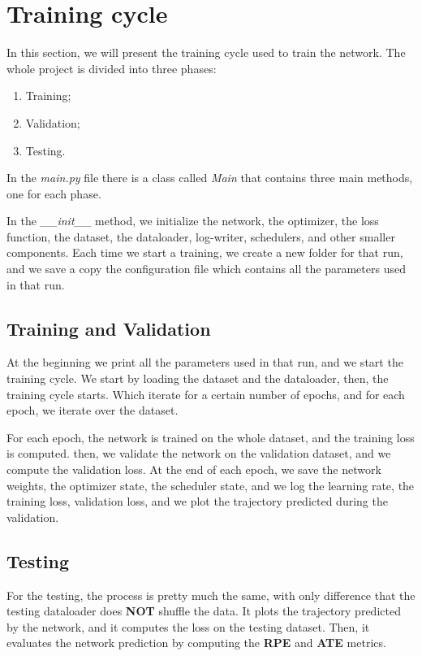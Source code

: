\section{Training cycle}\label{sec:training-cycle}
In this section, we will present the training cycle used to train the network.
The whole project is divided into three phases:
\begin{enumerate}
    \item Training;
    \item Validation;
    \item Testing.
\end{enumerate}
In the \textit{main.py} file there is a class called \textit{Main} that contains three main methods, one for each phase.

In the \textit{\_\_init\_\_} method, we initialize the network, the optimizer, the loss function, the dataset, the dataloader, log-writer, schedulers, and other smaller components.
Each time we start a training, we create a new folder for that run, and we save a copy the configuration file which contains all the parameters used in that run.

\subsection{Training and Validation}\label{subsec:training}
At the beginning we print all the parameters used in that run, and we start the training cycle.
We start by loading the dataset and the dataloader, then, the training cycle starts.
Which iterate for a certain number of epochs, and for each epoch, we iterate over the dataset.

For each epoch, the network is trained on the whole dataset, and the training loss is computed.
then, we validate the network on the validation dataset, and we compute the validation loss.
At the end of each epoch, we save the network weights, the optimizer state, the scheduler state, and we log the learning rate, the training loss, validation loss, and we plot the trajectory predicted during the validation.

\subsection{Testing}\label{subsec:testing}

For the testing, the process is pretty much the same, with only difference that the testing dataloader does \textbf{NOT} shuffle the data.
It plots the trajectory predicted by the network, and it computes the loss on the testing dataset.
Then, it evaluates the network prediction by computing the \textbf{RPE} and \textbf{ATE} metrics.